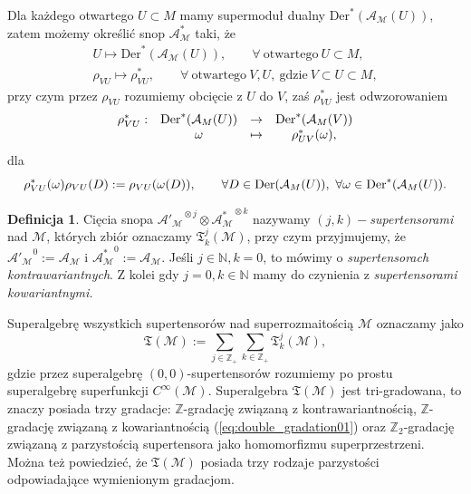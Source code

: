 \documentclass[11pt,a4paper]{report}
\theoremstyle{definition}
\newtheorem{definition}[theorem]{Definicja}
\begin{document}
Dla każdego otwartego $U \subset M$ mamy supermoduł dualny $\mathrm{Der}^*(\mathcal{A_M}(U))$, zatem możemy określić snop $\mathcal{A^*_M}$ taki, że
\begin{equation}
\begin{gathered}
U \mapsto \mathrm{Der}^*(\mathcal{A_M}(U)), \qquad \forall \mathrm{\ otwartego\ }U \subset M, \\
\rho_{VU} \mapsto \rho^*_{VU}, \qquad \forall \mathrm{\ otwartego\ } V,U, \mathrm{\ gdzie\ } V \subset U \subset M,
\end{gathered}
\end{equation}
przy czym przez $\rho_{VU}$ rozumiemy obcięcie z $U$ do $V$, zaś $\rho^*_{VU}$ jest odwzorowaniem
\begin{equation}
\begin{array}{rccc}
\rho^*_{VU}:&{\rm Der}^*(\mathcal{A}_M(U))&\rightarrow &{\rm Der}^*(\mathcal{A}_M(V))\\
&\omega&\mapsto&\rho^*_{UV}(\omega),
\end{array}
\end{equation}
dla
\begin{equation*}
\rho^*_{VU}(\omega)\rho_{VU}(D):=\rho_{VU}(\omega(D)),\qquad \forall D\in {\rm Der}(\mathcal{A}_M(U)),\ \forall \omega\in {\rm Der}^*(\mathcal{A}_M(U)).
\end{equation*}

\begin{definition}
Cięcia snopa $\mathcal{A'_M}^{\!\!\!\!\otimes j} \otimes \mathcal{A^*_M}^{\!\!\!\!\otimes k}$ nazywamy \textit{$(j,k)-$supertensorami} nad $\mathcal{M}$, których zbiór oznaczamy $\mathfrak{T}^j_k(\mathcal{M})$, przy czym przyjmujemy, że $\mathcal{A'_M}^{\!\!\!\!0} := \mathcal{A_M}$ i $ \mathcal{A^*_M}^{\!\!\!\!0} := \mathcal{A_M}.$ Jeśli $j \in \mathbb{N}, k=0$, to mówimy o \textit{supertensorach kontrawariantnych}. Z kolei gdy $j = 0, k \in \mathbb{N}$ mamy do czynienia z \textit{supertensorami kowariantnymi.}
\end{definition}

Superalgebrę wszystkich supertensorów nad superrozmaitością $\mathcal{M}$ oznaczamy jako
\begin{equation}
\label{eq:double_gradation01}
\mathfrak{T}(\mathcal{M}) := \sum_{j \in \mathbb{Z}_+} \sum_{k \in \mathbb{Z}_+} \mathfrak T^j_k(\mathcal{M}),
\end{equation}
gdzie przez superalgebrę $(0,0)$-supertensorów rozumiemy po prostu superalgebrę superfunkcji $C^\infty(\mathcal{M})$. Superalgebra $\mathfrak{T}(\mathcal{M})$ jest tri-gradowana, to znaczy posiada trzy gradacje: $\mathbb{Z}$-gradację związaną z kontrawariantnością, $\mathbb{Z}$-gradację związaną z kowariantnością (\ref{eq:double_gradation01}) oraz $\mathbb{Z}_2$-gradację związaną z parzystością supertensora jako homomorfizmu superprzestrzeni. Można też powiedzieć, że $\mathfrak{T}(\mathcal{M})$ posiada trzy rodzaje parzystości odpowiadające wymienionym gradacjom.
\end{document}
